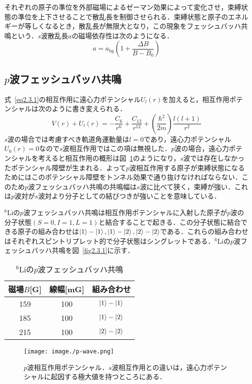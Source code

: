 \documentclass[11pt,a4j,notitlepage]{jreport}
\newcommand{\fig}[1]{図~\ref{#1}}	%
\newcommand{\eq}[1]{式~\eqref{#1}}	%
\begin{document}
それぞれの原子の準位を外部磁場によるゼーマン効果によって変化させ，束縛状態の準位を上下させることで散乱長を制御させられる．束縛状態と原子のエネルギーが等しくなるとき，散乱長が無限大となり，この現象をフェッシュバッハ共鳴という．$s$波散乱長$a$の磁場依存性は次のようになる．
\begin{equation}
	a = a_{\mathrm{bg}}\left(1+\frac{\Delta B}{B-B_{0}}\right)
	\label{eq2.3.2}
\end{equation}

\subsection{$p$波フェッシュバッハ共鳴}
\eq{eq2.3.1}の相互作用に遠心力ポテンシャル$U_{l}(r)$を加えると，相互作用ポテンシャルは次のように書き変えられる．
\begin{equation}
	V(r)+U_{l}(r) = - \frac{C_6}{r^6} + \frac{C_{12}}{r^{12}} + \left(\frac{\hbar^{2}}{2 m}\right) \frac{l(l+1)}{r^{2}}
	\label{eq2.3.3}
\end{equation}
$s$波の場合では考慮すべき軌道角運動量は$l=0$であり，遠心力ポテンシャル$U_{0}(r)=0$なので$s$波相互作用ではこの項は無視した．$p$波の場合，遠心力ポテンシャルを考えると相互作用の概形は\fig{fig2.3.2}のようになり，$s$波では存在しなかったポテンシャル障壁が生まれる．よって$p$波相互作用する原子が束縛状態になるためにはこのポテンシャル障壁をトンネル効果で通り抜けなければならない．このため$p$波フェッシュバッハ共鳴の共鳴幅は$s$波に比べて狭く，束縛が強い．これは$p$波対が$s$波対より分子としての結びつきが強いことを意味している．

$^6$Liの$p$波フェッシュバッハ共鳴は相互作用ポテンシャルに入射した原子が$p$波の分子状態$(S=0, I=1, L=1)$と結合することで起きる．この分子状態に結合できる原子の組み合わせは$\ket{1}-\ket{1}, \ket{1}-\ket{2}, \ket{2}-\ket{2}$である．これらの組み合わせはそれぞれスピントリプレット的で分子状態はシングレットである．$^6$Liの$p$波フェッシュバッハ共鳴を\fig{fig2.3.1}に示す．
\begin{table}[h]
\centering
	\caption{$^6$Liの$p$波フェッシュバッハ共鳴}
		\begin{tabular}{ccc}
		\hline
		磁場$B$[G] & 線幅[mG] & 組み合わせ \\ \hline
		159 & 100 & $\ket{1}-\ket{1}$ \\
		185 & 100 & $\ket{1}-\ket{2}$ \\
		215 & 100 & $\ket{2}-\ket{2}$ \\ \hline
		\end{tabular}
	\label{tab2.3.1}
\end{table}
\begin{figure}[h]
	\centering
		\texttt{[image: image./p-wave.png]}
	\caption{$p$波相互作用ポテンシャル．$s$波相互作用との違いは，遠心力ポテンシャルに起因する極大値を持つところにある．}
	\label{fig2.3.2}
\end{figure}
\end{document}
